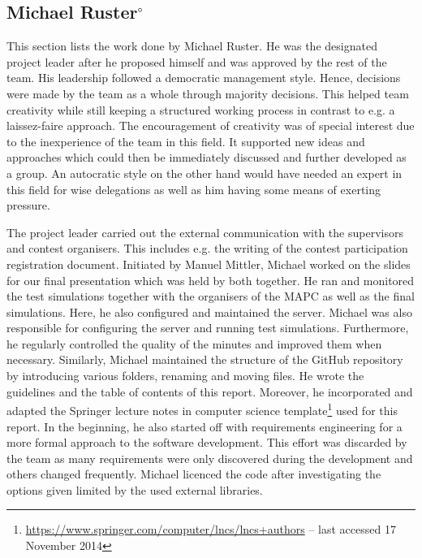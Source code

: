 \subsection[Michael Ruster]{Michael Ruster$^{\circ}$}
This section lists the work done by Michael Ruster.
He was the designated project leader after he proposed himself and was approved by the rest of the team.
His leadership followed a democratic management style.
Hence, decisions were made by the team as a whole through majority decisions.
This helped team creativity while still keeping a structured working process in contrast to e.g. a laissez-faire approach.
The encouragement of creativity was of special interest due to the inexperience of the team in this field.
It supported new ideas and approaches which could then be immediately discussed and further developed as a group.
An autocratic style on the other hand would have needed an expert in this field for wise delegations as well as him having some means of exerting pressure.

The project leader carried out the external communication with the supervisors and contest organisers.
This includes e.g. the writing of the contest participation registration document.
Initiated by Manuel Mittler, Michael worked on the slides for our final presentation which was held by both together.
He ran and monitored the test simulations together with the organisers of the MAPC as well as the final simulations.
Here, he also configured and maintained the server.
Michael was also responsible for configuring the server and running test simulations.
Furthermore, he regularly controlled the quality of the minutes and improved them when necessary.
Similarly, Michael maintained the structure of the GitHub repository by introducing various folders, renaming and moving files.
He wrote the guidelines and the table of contents of this report.
Moreover, he incorporated and adapted the Springer lecture notes in computer science template\footnote{\url{https://www.springer.com/computer/lncs/lncs+authors} -- last accessed 17 November 2014} used for this report.
In the beginning, he also started off with requirements engineering for a more formal approach to the software development.
This effort was discarded by the team as many requirements were only discovered during the development and others changed frequently.
Michael licenced the code after investigating the options given limited by the used external libraries.

